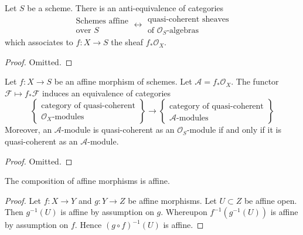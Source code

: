 \begin{lemma}
\label{lemma-affine-equivalence-algebras}
Let $S$ be a scheme. There is an anti-equivalence of categories
$$
\begin{matrix}
\text{Schemes affine} \\
\text{over }S
\end{matrix}
\longleftrightarrow
\begin{matrix}
\text{quasi-coherent sheaves} \\
\text{of }\mathcal{O}_S\text{-algebras}
\end{matrix}
$$
which associates to $f : X \to S$ the sheaf $f_*\mathcal{O}_X$.
\end{lemma}

\begin{proof}
Omitted.
\end{proof}

\begin{lemma}
\label{lemma-affine-equivalence-modules}
Let $f : X \to S$ be an affine morphism of schemes.
Let $\mathcal{A} = f_*\mathcal{O}_X$.
The functor $\mathcal{F} \mapsto f_*\mathcal{F}$ induces
an equivalence of categories
$$
\left\{
\begin{matrix}
\text{category of quasi-coherent}\\
\mathcal{O}_X\text{-modules}
\end{matrix}
\right\}
\longrightarrow
\left\{
\begin{matrix}
\text{category of quasi-coherent}\\
\mathcal{A}\text{-modules}
\end{matrix}
\right\}
$$
Moreover, an $\mathcal{A}$-module is
quasi-coherent as an $\mathcal{O}_S$-module if and only if
it is quasi-coherent as an $\mathcal{A}$-module.
\end{lemma}

\begin{proof}
Omitted.
\end{proof}

\begin{lemma}
\label{lemma-composition-affine}
The composition of affine morphisms is affine.
\end{lemma}

\begin{proof}
Let $f : X \to Y$ and $g : Y \to Z$ be affine morphisms.
Let $U \subset Z$ be affine open. Then $g^{-1}(U)$ is affine
by assumption on $g$. Whereupon $f^{-1}(g^{-1}(U))$ is affine
by assumption on $f$. Hence $(g \circ f)^{-1}(U)$ is affine.
\end{proof}

